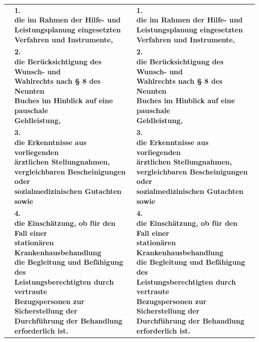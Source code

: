 \documentclass[10pt,a4paper,landscape]{article}
\begin{document}
\begin{longtable}{|L{8.2cm}|L{8.2cm}|L{8.2cm}|}
\hhline{|---|}
 & \textbf{1.   \newline die im Rahmen der Hilfe- und  \newline Leistungsplanung eingesetzten  \newline Verfahren und Instrumente, } & \textbf{1.   \newline die im Rahmen der Hilfe- und  \newline Leistungsplanung eingesetzten  \newline Verfahren und Instrumente, } \\
\hhline{|---|}
 & \textbf{2.   \newline die Berücksichtigung des Wunsch- und  \newline Wahlrechts nach \S{} 8 des Neunten  \newline Buches im Hinblick auf eine pauschale  \newline Geldleistung, } & \textbf{2.   \newline die Berücksichtigung des Wunsch- und  \newline Wahlrechts nach \S{} 8 des Neunten  \newline Buches im Hinblick auf eine pauschale  \newline Geldleistung, } \\
\hhline{|---|}
 & \textbf{3.   \newline die Erkenntnisse aus vorliegenden  \newline ärztlichen Stellungnahmen,  \newline vergleichbaren Bescheinigungen oder  \newline sozialmedizinischen Gutachten sowie } & \textbf{3.   \newline die Erkenntnisse aus vorliegenden  \newline ärztlichen Stellungnahmen,  \newline vergleichbaren Bescheinigungen oder  \newline sozialmedizinischen Gutachten sowie } \\
\hhline{|---|}
 & \textbf{4.   \newline die Einschätzung, ob für den Fall einer  \newline stationären Krankenhausbehandlung  \newline die Begleitung und Befähigung des  \newline Leistungsberechtigten durch vertraute  \newline Bezugspersonen zur Sicherstellung der  \newline Durchführung der Behandlung  \newline erforderlich ist. } & \textbf{4.   \newline die Einschätzung, ob für den Fall einer  \newline stationären Krankenhausbehandlung  \newline die Begleitung und Befähigung des  \newline Leistungsberechtigten durch vertraute  \newline Bezugspersonen zur Sicherstellung der  \newline Durchführung der Behandlung  \newline erforderlich ist. } \\

\end{longtable}
\end{document}

